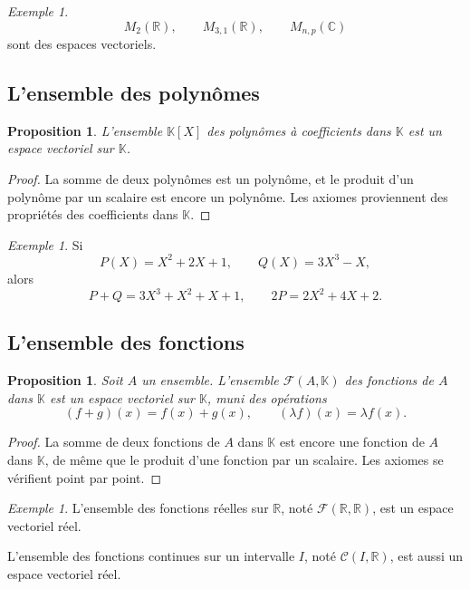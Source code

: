 \documentclass[11pt,a4paper]{article}
\newtheorem{proposition}[definition]{Proposition}
\theoremstyle{remark}
\newtheorem{exemple}[definition]{Exemple}
\newcommand{\R}{\mathbb{R}}
\newcommand{\C}{\mathbb{C}}
\newcommand{\K}{\mathbb{K}}
\begin{document}
\begin{exemple}
\[
M_2(\R),\qquad M_{3,1}(\R),\qquad M_{n,p}(\C)
\]
sont des espaces vectoriels.
\end{exemple}

\subsection{L’ensemble des polynômes}

\begin{proposition}
L’ensemble \(\K[X]\) des polynômes à coefficients dans \(\K\) est un espace vectoriel sur \(\K\).
\end{proposition}

\begin{proof}
La somme de deux polynômes est un polynôme, et le produit d’un polynôme par un scalaire est encore un polynôme. Les axiomes proviennent des propriétés des coefficients dans \(\K\).
\end{proof}

\begin{exemple}
Si
\[
P(X)=X^2+2X+1,\qquad Q(X)=3X^3-X,
\]
alors
\[
P+Q=3X^3+X^2+X+1,
\qquad
2P=2X^2+4X+2.
\]
\end{exemple}

\subsection{L’ensemble des fonctions}

\begin{proposition}
Soit \(A\) un ensemble. L’ensemble \(\mathcal{F}(A,\K)\) des fonctions de \(A\) dans \(\K\) est un espace vectoriel sur \(\K\), muni des opérations
\[
(f+g)(x)=f(x)+g(x),\qquad (\lambda f)(x)=\lambda f(x).
\]
\end{proposition}

\begin{proof}
La somme de deux fonctions de \(A\) dans \(\K\) est encore une fonction de \(A\) dans \(\K\), de même que le produit d’une fonction par un scalaire. Les axiomes se vérifient point par point.
\end{proof}

\begin{exemple}
L’ensemble des fonctions réelles sur \(\R\), noté \(\mathcal{F}(\R,\R)\), est un espace vectoriel réel.

L’ensemble des fonctions continues sur un intervalle \(I\), noté \(\mathcal{C}(I,\R)\), est aussi un espace vectoriel réel.
\end{exemple}
\end{document}
